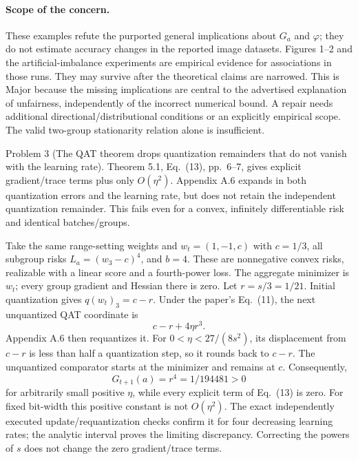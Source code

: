 \documentclass[10pt]{article}
\begin{document}
\paragraph*{Scope of the concern.}\mbox{}\par
These examples refute the purported general implications about \(G_a\) and \(\varphi\); they do not estimate accuracy changes in the reported image datasets. Figures 1–2 and the artificial-imbalance experiments are empirical evidence for associations in those runs. They may survive after the theoretical claims are narrowed. This is Major because the missing implications are central to the advertised explanation of unfairness, independently of the incorrect numerical bound. A repair needs additional directional/distributional conditions or an explicitly empirical scope. The valid two-group stationarity relation alone is insufficient.\par
Problem 3 (The QAT theorem drops quantization remainders that do not vanish with the learning rate).  Theorem 5.1, Eq. (13), pp. 6–7, gives explicit gradient/trace terms plus only \(O(\eta^2)\). Appendix A.6 expands in both quantization errors and the learning rate, but does not retain the independent quantization remainder. This fails even for a convex, infinitely differentiable risk and identical batches/groups.\par
Take the same range-setting weights and \(w_t=(1,-1,c)\) with \(c=1/3\), all subgroup risks \(L_a=(w_3-c)^4\), and \(b=4\). These are nonnegative convex risks, realizable with a linear score and a fourth-power loss. The aggregate minimizer is \(w_t\); every group gradient and Hessian there is zero. Let \(r=s/3=1/21\). Initial quantization gives \(q(w_t)_3=c-r\). Under the paper’s Eq. (11), the next unquantized QAT coordinate is \[c-r+4\eta r^3.\] Appendix A.6 then requantizes it. For \(0<\eta<27/(8s^2)\), its displacement from \(c-r\) is less than half a quantization step, so it rounds back to \(c-r\). The unquantized comparator starts at the minimizer and remains at \(c\). Consequently, \[G_{t+1}(a)=r^4=1/194481>0\] for arbitrarily small positive \(\eta\), while every explicit term of Eq. (13) is zero. For fixed bit-width this positive constant is not \(O(\eta^2)\). The exact independently executed update/requantization checks confirm it for four decreasing learning rates; the analytic interval proves the limiting discrepancy. Correcting the powers of \(s\) does not change the zero gradient/trace terms.\par
\end{document}
